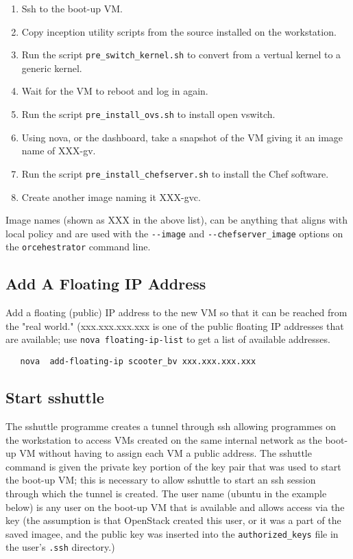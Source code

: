 \begin{enumerate}
	\item Ssh to the boot-up VM.
	\item Copy inception utility scripts from the source installed on the workstation.
	\item Run the script \verb!pre_switch_kernel.sh! to convert from a vertual kernel to a generic kernel.
	\item Wait for the VM to reboot and log in again.
	\item Run the script \verb!pre_install_ovs.sh! to install open vswitch.
	\item Using nova, or the dashboard, take a snapshot of the VM giving it an image name of XXX-gv.
	\item Run the script \verb!pre_install_chefserver.sh! to install the Chef software.
	\item Create another image naming it XXX-gvc.
\end{enumerate}

Image names (shown as XXX in the above list), can be anything that aligns with local policy and are used
with the \verb!--image! and \verb!--chefserver_image! options on the \verb!orcehestrator! command line.

\subsection{Add A Floating IP Address}
Add a floating (public) IP address to the new VM so that it can be reached from the "real world."
(xxx.xxx.xxx.xxx is one of the public floating IP addresses that are available; use \verb!nova floating-ip-list!
to get a list of available addresses.

\small\begin{verbatim}
   nova  add-floating-ip scooter_bv xxx.xxx.xxx.xxx
\end{verbatim}\normalsize

\subsection{Start sshuttle}
The sshuttle programme creates a tunnel through ssh allowing programmes on the workstation to access VMs created on the
same internal network as the boot-up VM without having to assign each VM a public address.
The sshuttle command is given the private key portion of the key pair that was used to start the boot-up VM; this is
necessary to allow sshuttle to start an ssh session through which the tunnel is created.
The user name (ubuntu in the example below) is any user on the boot-up VM that is available and allows access via
the key (the assumption is that OpenStack created this user, or it was a part of the saved imagee,  and the public key was
inserted into the \verb!authorized_keys! file in the user's \verb!.ssh! directory.)

